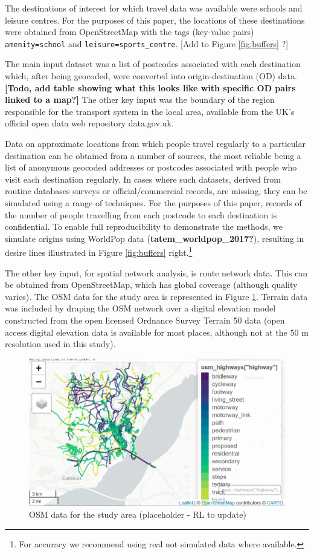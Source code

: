 \documentclass[galley]{jtlu-article-2col}
\begin{document}
The destinations of interest for which travel data was available were schools and leisure centres.
For the purposes of this paper, the locations of these destinations were obtained from OpenStreetMap with the tags (key-value pairs) \texttt{amenity=school} and \texttt{leisure=sports\_centre}.
{[}Add to Figure \ref{fig:buffers} ?{]}

The main input dataset was a list of postcodes associated with each destination which, after being geocoded, were converted into origin-destination (OD) data.
\textbf{{[}Todo, add table showing what this looks like with specific OD pairs linked to a map?{]}}
The other key input was the boundary of the region responsible for the transport system in the local area, available from the UK's official open data web repository data.gov.uk.

Data on approximate locations from which people travel regularly to a particular destination can be obtained from a number of sources, the most reliable being a list of anonymous geocoded addresses or postcodes associated with people who visit each destination regularly.
In cases where such datasets, derived from routine databases surveys or official/commercial records, are missing, they can be simulated using a range of techniques.
For the purposes of this paper, records of the number of people travelling from each postcode to each destination is confidential.
To enable full reproducibility to demonstrate the methods, we simulate origins using WorldPop data (\textbf{tatem\_worldpop\_2017?}), resulting in desire lines illustrated in Figure \ref{fig:buffers} right.\footnote{
  For accuracy we recommend using real not simulated data where available.}

The other key input, for spatial network analysis, is route network data.
This can be obtained from OpenStreetMap, which has global coverage (although quality varies).
The OSM data for the study area is represented in Figure \ref{fig:osminput}.
Terrain data was included by draping the OSM network over a digital elevation model constructed from the open licensed Ordnance Survey Terrain 50 data (open access digital elevation data is available for most places, although not at the 50 m resolution used in this study).

\begin{figure}

{\centering \includegraphics[width=0.5\linewidth]{figures/osm-infra-chepstow} 

}

\caption{OSM data for the study area (placeholder - RL to update)}\label{fig:osminput}
\end{figure}
\end{document}
